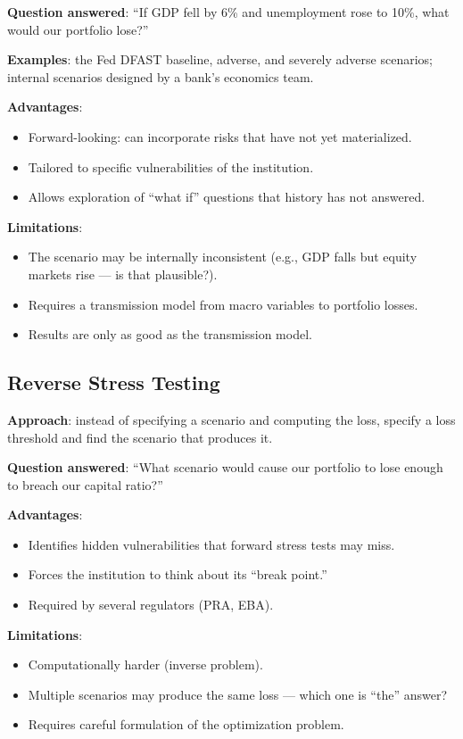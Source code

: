 \documentclass[11pt, a4paper]{article}
\theoremstyle{definition}
\theoremstyle{plain}
\theoremstyle{remark}
\begin{document}
\textbf{Question answered}: ``If GDP fell by 6\% and unemployment rose to 10\%,
what would our portfolio lose?''

\textbf{Examples}: the Fed DFAST baseline, adverse, and severely adverse scenarios;
internal scenarios designed by a bank's economics team.

\textbf{Advantages}:
\begin{itemize}
    \item Forward-looking: can incorporate risks that have not yet materialized.
    \item Tailored to specific vulnerabilities of the institution.
    \item Allows exploration of ``what if'' questions that history has not answered.
\end{itemize}

\textbf{Limitations}:
\begin{itemize}
    \item The scenario may be internally inconsistent
          (e.g., GDP falls but equity markets rise --- is that plausible?).
    \item Requires a transmission model from macro variables to portfolio losses.
    \item Results are only as good as the transmission model.
\end{itemize}

\subsection{Reverse Stress Testing}

\textbf{Approach}: instead of specifying a scenario and computing the loss,
specify a loss threshold and find the scenario that produces it.

\textbf{Question answered}: ``What scenario would cause our portfolio
to lose enough to breach our capital ratio?''

\textbf{Advantages}:
\begin{itemize}
    \item Identifies hidden vulnerabilities that forward stress tests may miss.
    \item Forces the institution to think about its ``break point.''
    \item Required by several regulators (PRA, EBA).
\end{itemize}

\textbf{Limitations}:
\begin{itemize}
    \item Computationally harder (inverse problem).
    \item Multiple scenarios may produce the same loss --- which one is ``the'' answer?
    \item Requires careful formulation of the optimization problem.
\end{itemize}
\end{document}
